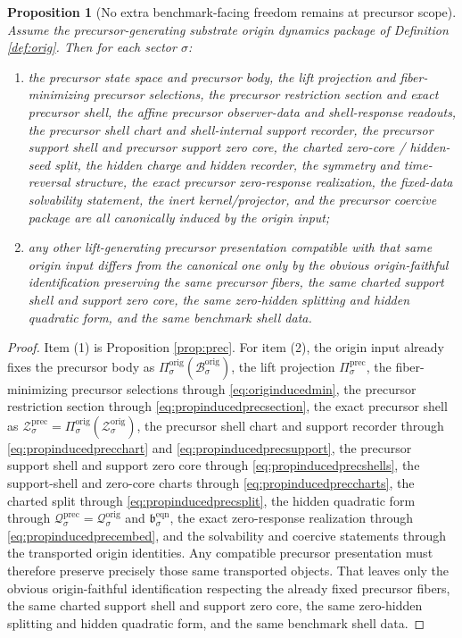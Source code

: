 \documentclass[11pt]{article}
\newcommand{\EqnPair}[1]{\mathfrak b_{#1}^{\mathrm{eqn}}}
\newcommand{\PrecProj}[1]{\Pi_{#1}^{\mathrm{prec}}}
\newcommand{\PrecShellSet}[1]{\mathcal Z_{#1}^{\mathrm{prec}}}
\newcommand{\PrecCharge}[1]{\mathcal Q_{#1}^{\mathrm{prec}}}
\newcommand{\OrigBody}[1]{\mathcal B_{#1}^{\mathrm{orig}}}
\newcommand{\OrigProj}[1]{\Pi_{#1}^{\mathrm{orig}}}
\newcommand{\OrigShellSet}[1]{\mathcal Z_{#1}^{\mathrm{orig}}}
\newcommand{\OrigCharge}[1]{\mathcal Q_{#1}^{\mathrm{orig}}}
\newtheorem{proposition}{Proposition}
\begin{document}
\begin{proposition}[No extra benchmark-facing freedom remains at precursor scope]
\label{prop:unique}
Assume the precursor-generating substrate origin dynamics package of Definition \ref{def:orig}. Then for each sector \(\sigma\):
\begin{enumerate}
    \item the precursor state space and precursor body, the lift projection and fiber-minimizing precursor selections, the precursor restriction section and exact precursor shell, the affine precursor observer-data and shell-response readouts, the precursor shell chart and shell-internal support recorder, the precursor support shell and precursor support zero core, the charted zero-core / hidden-seed split, the hidden charge and hidden recorder, the symmetry and time-reversal structure, the exact precursor zero-response realization, the fixed-data solvability statement, the inert kernel/projector, and the precursor coercive package are all canonically induced by the origin input;
    \item any other lift-generating precursor presentation compatible with that same origin input differs from the canonical one only by the obvious origin-faithful identification preserving the same precursor fibers, the same charted support shell and support zero core, the same zero-hidden splitting and hidden quadratic form, and the same benchmark shell data.
\end{enumerate}
\end{proposition}

\begin{proof}
Item (1) is Proposition \ref{prop:prec}. For item (2), the origin input already fixes the precursor body as \(\OrigProj{\sigma}(\OrigBody{\sigma})\), the lift projection \(\PrecProj{\sigma}\), the fiber-minimizing precursor selections through \eqref{eq:originducedmin}, the precursor restriction section through \eqref{eq:propinducedprecsection}, the exact precursor shell as \(\PrecShellSet{\sigma}=\OrigProj{\sigma}(\OrigShellSet{\sigma})\), the precursor shell chart and support recorder through \eqref{eq:propinducedprecchart} and \eqref{eq:propinducedprecsupport}, the precursor support shell and support zero core through \eqref{eq:propinducedprecshells}, the support-shell and zero-core charts through \eqref{eq:propinducedpreccharts}, the charted split through \eqref{eq:propinducedprecsplit}, the hidden quadratic form through \(\PrecCharge{\sigma}=\OrigCharge{\sigma}\) and \(\EqnPair{\sigma}\), the exact zero-response realization through \eqref{eq:propinducedprecembed}, and the solvability and coercive statements through the transported origin identities. Any compatible precursor presentation must therefore preserve precisely those same transported objects. That leaves only the obvious origin-faithful identification respecting the already fixed precursor fibers, the same charted support shell and support zero core, the same zero-hidden splitting and hidden quadratic form, and the same benchmark shell data.
\end{proof}
\end{document}
